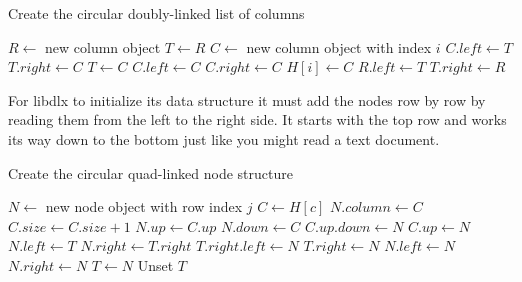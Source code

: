\begin{algorithm}[H]
	\caption{Create the circular doubly-linked list of columns}
	\label{algocolumns}
	\begin{algorithmic}[1]
		\STATE $R \leftarrow$ new column object
		\STATE $T \leftarrow R$
			\STATE $C \leftarrow$ new column object with index $i$
				\STATE $C.left \leftarrow T$
				\STATE $T.right \leftarrow C$
				\STATE $T \leftarrow C$
			\ELSE \label{algosecondary}
				\STATE $C.left \leftarrow C$
				\STATE $C.right \leftarrow C$
			\ENDIF
			\STATE $H[i] \leftarrow C$
		\ENDFOR
		\STATE $R.left \leftarrow T$
		\STATE $T.right \leftarrow R$
	\end{algorithmic}
\end{algorithm}

For libdlx to initialize its data structure it must add the nodes row by row by reading them from the left to the right side.
It starts with the top row and works its way down to the bottom just like you might read a text document.


\begin{algorithm}[H]
	\caption{Create the circular quad-linked node structure}
	\label{algonodes}
	\begin{algorithmic}[1]
				\STATE $N \leftarrow$ new node object with row index $j$
				\STATE $C \leftarrow H[c]$
				\STATE $N.column \leftarrow C$
				\STATE $C.size \leftarrow C.size + 1$
				\STATE $N.up \leftarrow C.up$
				\STATE $N.down \leftarrow C$
				\STATE $C.up.down \leftarrow N$
				\STATE $C.up \leftarrow N$
					\STATE $N.left \leftarrow T$
					\STATE $N.right \leftarrow T.right$
					\STATE $T.right.left \leftarrow N$
					\STATE $T.right \leftarrow N$
				\ELSE
					\STATE $N.left \leftarrow N$  
					\STATE $N.right \leftarrow N$
				\ENDIF
				\STATE $T \leftarrow N$
			\ENDFOR
			\STATE Unset $T$
		\ENDFOR
	\end{algorithmic}
\end{algorithm}

